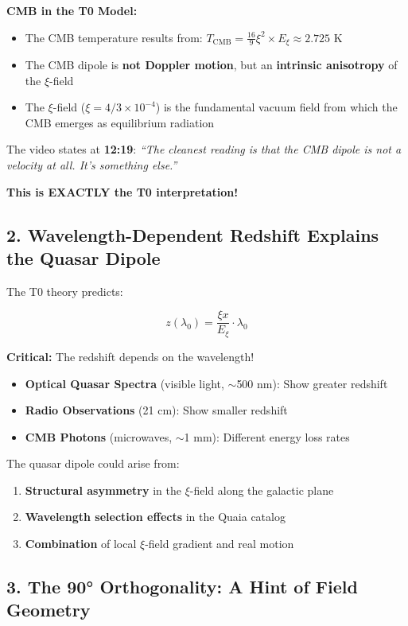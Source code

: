 \documentclass{article}
\begin{document}
	\textbf{CMB in the T0 Model:}
	\begin{itemize}
		\item The CMB temperature results from: $T_{\text{CMB}} = \frac{16}{9} \xi^2 \times E_\xi \approx 2.725$ K
		\item The CMB dipole is \textbf{not Doppler motion}, but an \textbf{intrinsic anisotropy} of the $\xi$-field
		\item The $\xi$-field ($\xi = 4/3 \times 10^{-4}$) is the fundamental vacuum field from which the CMB emerges as equilibrium radiation
	\end{itemize}
	
	The video states at \textbf{12:19}: \textit{``The cleanest reading is that the CMB dipole is not a velocity at all. It's something else.''}
	
	\textbf{This is EXACTLY the T0 interpretation!}
	
	\subsection{2. Wavelength-Dependent Redshift Explains the Quasar Dipole}
	
	The T0 theory predicts:
	
	$$z(\lambda_0) = \frac{\xi x}{E_\xi} \cdot \lambda_0$$
	
	\textbf{Critical:} The redshift depends on the wavelength!
	
	\begin{itemize}
		\item \textbf{Optical Quasar Spectra} (visible light, $\sim$500 nm): Show greater redshift
		\item \textbf{Radio Observations} (21 cm): Show smaller redshift
		\item \textbf{CMB Photons} (microwaves, $\sim$1 mm): Different energy loss rates
	\end{itemize}
	
	The quasar dipole could arise from:
	\begin{enumerate}
		\item \textbf{Structural asymmetry} in the $\xi$-field along the galactic plane
		\item \textbf{Wavelength selection effects} in the Quaia catalog \cite{storey2024}
		\item \textbf{Combination} of local $\xi$-field gradient and real motion
	\end{enumerate}
	
	\subsection{3. The 90° Orthogonality: A Hint of Field Geometry}
	
\end{document}
